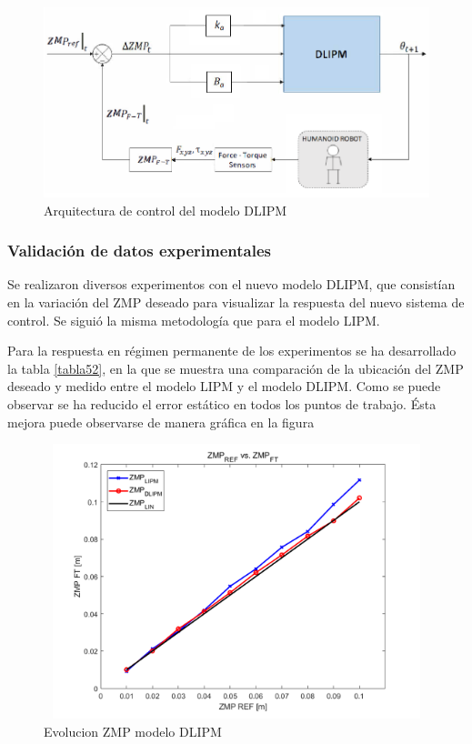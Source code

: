 \begin{figure}[H]
\centering
\includegraphics[scale=0.55]{imagenes/apartado_5/510_esquema_DLIPM}
\caption{Arquitectura de control del modelo DLIPM}
\label{figura511}
\end{figure}

\subsubsection{Validación de datos experimentales}

Se realizaron diversos experimentos con el nuevo modelo DLIPM, que consistían en la variación del ZMP deseado para visualizar la respuesta del nuevo sistema de control. Se siguió la misma metodología que para el modelo LIPM.

Para la respuesta en régimen permanente de los experimentos se ha desarrollado la tabla \ref{tabla52}, en la que se muestra una comparación de la ubicación del ZMP deseado y medido entre el modelo LIPM y el modelo DLIPM. Como se puede observar se ha reducido el error estático en todos los puntos de trabajo. Ésta mejora puede observarse de manera gráfica en la figura %

\begin{figure}[H]
\centering
\includegraphics[width=13cm, height=8cm]{imagenes/apartado_5/511_compErrorModels}
\caption{Evolucion ZMP modelo DLIPM}
\label{figura512}
\end{figure}


